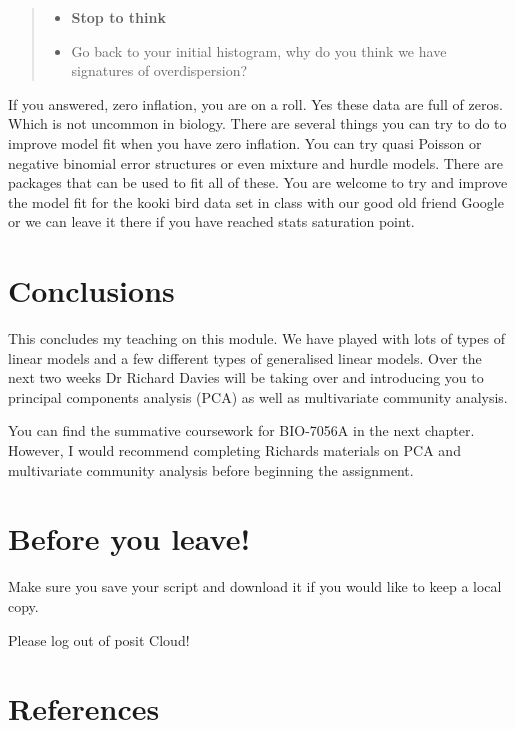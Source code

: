 \documentclass[
]{book}
\providecommand{\tightlist}{%
  \setlength{\itemsep}{0pt}\setlength{\parskip}{0pt}}
\begin{document}
\begin{quote}
\begin{itemize}
\tightlist
\item
  \textbf{Stop to think}
\item
  Go back to your initial histogram, why do you think we have signatures of overdispersion?
\end{itemize}
\end{quote}

If you answered, zero inflation, you are on a roll. Yes these data are full of zeros. Which is not uncommon in biology. There are several things you can try to do to improve model fit when you have zero inflation. You can try quasi Poisson or negative binomial error structures or even mixture and hurdle models. There are packages that can be used to fit all of these. You are welcome to try and improve the model fit for the kooki bird data set in class with our good old friend Google or we can leave it there if you have reached stats saturation point.

\section{Conclusions}\label{conclusions-2}

This concludes my teaching on this module. We have played with lots of types of linear models and a few different types of generalised linear models. Over the next two weeks Dr Richard Davies will be taking over and introducing you to principal components analysis (PCA) as well as multivariate community analysis.

You can find the summative coursework for BIO-7056A in the next chapter. However, I would recommend completing Richards materials on PCA and multivariate community analysis before beginning the assignment.

\section{Before you leave!}\label{before-you-leave-10}

Make sure you save your script and download it if you would like to keep a local copy.

Please log out of posit Cloud!

\section{References}\label{references-7}
\end{document}
